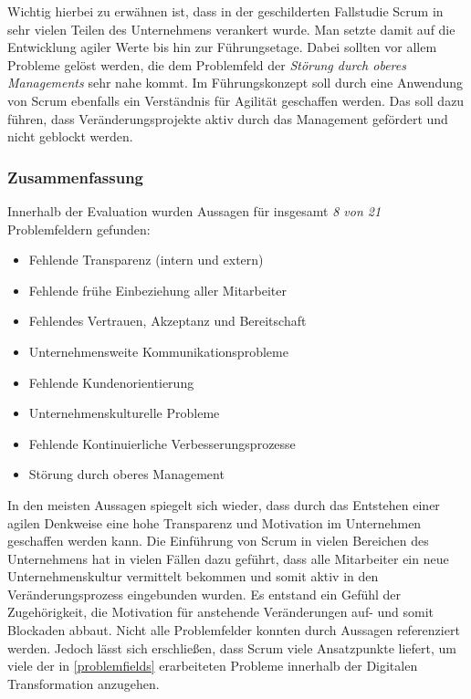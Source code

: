 Wichtig hierbei zu erwähnen ist, dass in der geschilderten Fallstudie Scrum in sehr vielen Teilen des Unternehmens verankert wurde. Man setzte damit auf die Entwicklung agiler Werte bis hin zur Führungsetage. Dabei sollten vor allem Probleme gelöst werden, die dem Problemfeld der \textit{Störung durch oberes Managements} sehr nahe kommt. Im Führungskonzept soll durch eine Anwendung von Scrum ebenfalls ein Verständnis für Agilität geschaffen werden. Das soll dazu führen, dass Veränderungsprojekte aktiv durch das Management gefördert und nicht geblockt werden.

\todots

\subsubsection{Zusammenfassung}

Innerhalb der Evaluation wurden Aussagen für insgesamt \textit{8 von 21} Problemfeldern gefunden:

\begin{itemize}[noitemsep, topsep=0pt]
	\item Fehlende Transparenz (intern und extern)
	\item Fehlende frühe Einbeziehung aller Mitarbeiter
	\item Fehlendes Vertrauen, Akzeptanz und Bereitschaft
	\item Unternehmensweite Kommunikationsprobleme
	\item Fehlende Kundenorientierung
	\item Unternehmenskulturelle Probleme
	\item Fehlende Kontinuierliche Verbesserungsprozesse
	\item Störung durch oberes Management
\end{itemize}

In den meisten Aussagen spiegelt sich wieder, dass durch das Entstehen einer agilen Denkweise eine hohe Transparenz und Motivation im Unternehmen geschaffen werden kann. Die Einführung von Scrum in vielen Bereichen des Unternehmens hat in vielen Fällen dazu geführt, dass alle Mitarbeiter ein neue Unternehmenskultur vermittelt bekommen und somit aktiv in den Veränderungsprozess eingebunden wurden. Es entstand ein Gefühl der Zugehörigkeit, die Motivation für anstehende Veränderungen auf- und somit Blockaden abbaut. Nicht alle Problemfelder konnten durch Aussagen referenziert werden. Jedoch lässt sich erschließen, dass Scrum viele Ansatzpunkte liefert, um viele der in \ref{problemfields} erarbeiteten Probleme innerhalb der Digitalen Transformation anzugehen.

